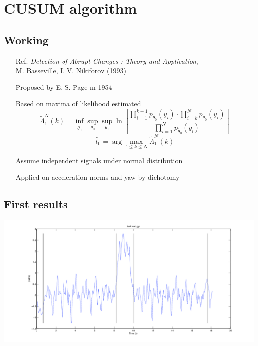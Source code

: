 \documentclass{beamer}
\begin{document}
\section{CUSUM algorithm}
\subsection{Working}

\begin{frame}
\begin{itemize}
\item[Ref.] \emph{Detection of Abrupt Changes : Theory and Application},\\
M. Basseville, I. V. Nikiforov (1993)
\item[Proposed] by E. S. Page in 1954
\item[Based] on maxima of likelihood estimated
\[\tilde\varLambda_1^N(k)=\inf_{\tilde\theta_0}\sup_{\theta_0}\sup_{\theta_1}\ln\left[\frac{\prod_{i=1}^{k-1}p_{\theta_0}(y_i)\cdot\prod_{i=k}^Np_{\theta_0}(y_i)}{\prod_{i=1}^Np_{\tilde\theta_0}(y_i)}\right]\]
\[\hat t_0=\arg\max_{1\le k\le N}\tilde\varLambda_1^N(k)\]
\item[Assume] independent signals under normal distribution
\item[Applied] on acceleration norms and yaw by dichotomy
\end{itemize}
\end{frame}

\subsection{First results}

\begin{frame}
\hspace*{-2.8cm}\includegraphics[scale=0.4]{examplecusumbackvertgyr}
\end{frame}
\end{document}
